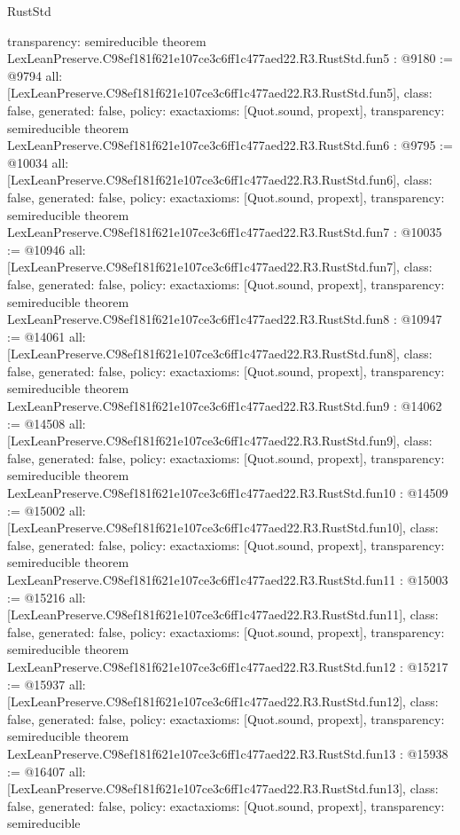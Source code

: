 \begin{lexlean}{RustStd}
\begin{coremodule}
{  transparency: semireducible
}
theorem LexLeanPreserve.C98ef181f621e107ce3c6ff1c477aed22.R3.RustStd.fun5 : @9180 := @9794 {
  all: [LexLeanPreserve.C98ef181f621e107ce3c6ff1c477aed22.R3.RustStd.fun5],
  class: false,
  generated: false,
  policy: exact{axioms: [Quot.sound, propext]},
  transparency: semireducible
}
theorem LexLeanPreserve.C98ef181f621e107ce3c6ff1c477aed22.R3.RustStd.fun6 : @9795 := @10034 {
  all: [LexLeanPreserve.C98ef181f621e107ce3c6ff1c477aed22.R3.RustStd.fun6],
  class: false,
  generated: false,
  policy: exact{axioms: [Quot.sound, propext]},
  transparency: semireducible
}
theorem LexLeanPreserve.C98ef181f621e107ce3c6ff1c477aed22.R3.RustStd.fun7 : @10035 := @10946 {
  all: [LexLeanPreserve.C98ef181f621e107ce3c6ff1c477aed22.R3.RustStd.fun7],
  class: false,
  generated: false,
  policy: exact{axioms: [Quot.sound, propext]},
  transparency: semireducible
}
theorem LexLeanPreserve.C98ef181f621e107ce3c6ff1c477aed22.R3.RustStd.fun8 : @10947 := @14061 {
  all: [LexLeanPreserve.C98ef181f621e107ce3c6ff1c477aed22.R3.RustStd.fun8],
  class: false,
  generated: false,
  policy: exact{axioms: [Quot.sound, propext]},
  transparency: semireducible
}
theorem LexLeanPreserve.C98ef181f621e107ce3c6ff1c477aed22.R3.RustStd.fun9 : @14062 := @14508 {
  all: [LexLeanPreserve.C98ef181f621e107ce3c6ff1c477aed22.R3.RustStd.fun9],
  class: false,
  generated: false,
  policy: exact{axioms: [Quot.sound, propext]},
  transparency: semireducible
}
theorem LexLeanPreserve.C98ef181f621e107ce3c6ff1c477aed22.R3.RustStd.fun10 : @14509 := @15002 {
  all: [LexLeanPreserve.C98ef181f621e107ce3c6ff1c477aed22.R3.RustStd.fun10],
  class: false,
  generated: false,
  policy: exact{axioms: [Quot.sound, propext]},
  transparency: semireducible
}
theorem LexLeanPreserve.C98ef181f621e107ce3c6ff1c477aed22.R3.RustStd.fun11 : @15003 := @15216 {
  all: [LexLeanPreserve.C98ef181f621e107ce3c6ff1c477aed22.R3.RustStd.fun11],
  class: false,
  generated: false,
  policy: exact{axioms: [Quot.sound, propext]},
  transparency: semireducible
}
theorem LexLeanPreserve.C98ef181f621e107ce3c6ff1c477aed22.R3.RustStd.fun12 : @15217 := @15937 {
  all: [LexLeanPreserve.C98ef181f621e107ce3c6ff1c477aed22.R3.RustStd.fun12],
  class: false,
  generated: false,
  policy: exact{axioms: [Quot.sound, propext]},
  transparency: semireducible
}
theorem LexLeanPreserve.C98ef181f621e107ce3c6ff1c477aed22.R3.RustStd.fun13 : @15938 := @16407 {
  all: [LexLeanPreserve.C98ef181f621e107ce3c6ff1c477aed22.R3.RustStd.fun13],
  class: false,
  generated: false,
  policy: exact{axioms: [Quot.sound, propext]},
  transparency: semireducible
}
\end{coremodule}
\end{lexlean}
